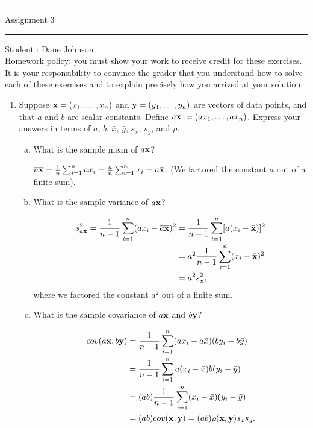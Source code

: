 \documentclass[letterpaper,12pt,fleqn]{article}
\begin{document}
\pagestyle{empty}

\hrule \vspace{0.5em}
 \hfill Assignment 3 \newline \hrule

\vspace{1em}

Student : Dane Johnson \\

Homework policy: you must show your work to receive credit for these exercises.  It is your responsibility to convince the grader that you understand how to solve each of these exercises and to explain precisely how you arrived at your solution.

\vspace{1em}

\begin{enumerate}

\item Suppose ${\bf x} = (x_{1}, \ldots, x_{n})$ and ${\bf y} = (y_{1}, \ldots, y_{n})$ are vectors of data points, and that $a$ and $b$ are scalar constants. Define $a {\bf x} := (ax_{1}, \ldots, a x_{n})$. Express your answers in terms of $a$, $b$, $\bar{x}$, $\bar{y}$, $s_{x}$, $s_{y}$, and $\rho$.

\begin{enumerate}[a)]
\item What is the sample mean of $a {\bf x}$?

$\overline{a\bf x} = \frac{1}{n} \sum_{i = 1}^{n} ax_i = \frac{a}{n} \sum_{i = 1}^{n} x_i = a\bar{\bf x}.$ (We factored the constant $a$ out of a finite sum).

\item What is the sample variance of $a {\bf x}$?

\begin{align*}
s_{a{\bf x}}^2 = \frac{1}{n-1} \sum_{i=1}^{n} (ax_i - \overline{a {\bf x}})^2 &= \frac{1}{n-1} \sum_{i = 1}^{n} [a(x_i - \bar{{\bf x}})]^2 \\
&= a^2\frac{1}{n-1} \sum_{i = 1}^{n} (x_i - \bar{{\bf x}})^2 \\
&= a^2s_{\bf x}^2,
\end{align*}
where we factored the constant $a^2$ out of a finite sum.
\item What is the sample covariance of $a {\bf x}$ and $b {\bf y}$?

\begin{align*}
cov(a {\bf x}, b {\bf y}) &= \frac{1}{n-1} \sum_{i = 1}^{n} (ax_i - a\bar{x})(by_i - b\bar{y}) \\
&= \frac{1}{n-1} \sum_{i = 1}^{n} a(x_i - \bar{x})b(y_i - \bar{y}) \\
&= (ab)\frac{1}{n-1} \sum_{i = 1}^{n} (x_i - \bar{x})(y_i - \bar{y}) \\
&= (ab)cov({\bf x}, {\bf y}) = (ab)\rho(\textbf{x},\textbf{y})s_xs_y.
\end{align*}


\end{enumerate}
\end{enumerate}
\end{document}
